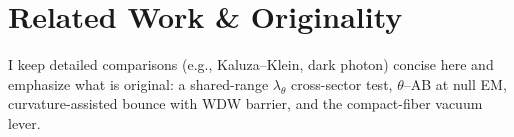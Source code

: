 \section{Related Work \& Originality}\label{sec:related-work}
I keep detailed comparisons (e.g., Kaluza--Klein, dark photon) concise here and emphasize what is original: a shared-range $\lambda_\theta$ cross-sector test, $\theta$--AB at null EM, curvature-assisted bounce with WDW barrier, and the compact-fiber vacuum lever.
